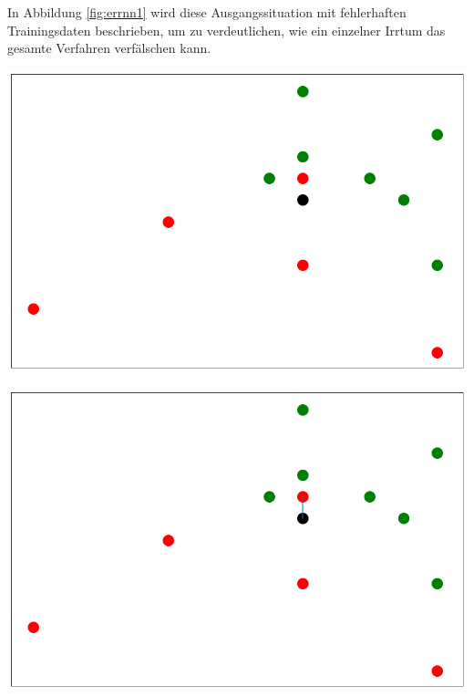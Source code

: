 \documentclass[fontsize=11pt]{scrartcl}
\newenvironment{Figure}
  {\par\medskip\noindent\minipage{\linewidth}}
  {\endminipage\par\medskip}
\begin{document}
                         
                In Abbildung \ref{fig:errnn1} wird diese Ausgangssituation mit fehlerhaften Trainingsdaten beschrieben, um zu verdeutlichen, wie ein einzelner Irrtum das gesamte Verfahren verfälschen kann. \par 
                \begin{Figure}
                    \begin{minipage}[b]{.4\linewidth}
                        \includegraphics[width=\linewidth]{errnn1.png}
                        \label{fig:errnn1}
                    \end{minipage}
                    \hspace*{.1\linewidth}
                    \begin{minipage}[b]{.4\linewidth}
                        \includegraphics[width=\linewidth]{errnn2.png}
                        \label{fig:errnn2}
                    \end{minipage}
                \end{Figure}
\end{document}
